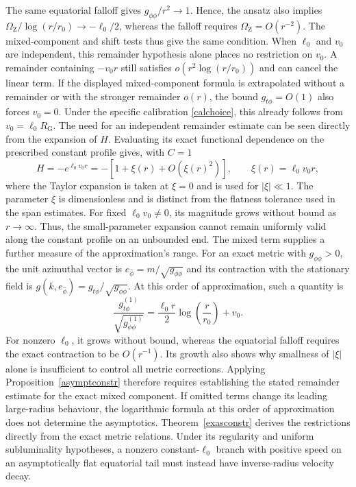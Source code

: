 \documentclass[amsmath,amsfonts,amssymb,aps,pra,superscriptaddress,10pt]{revtex4-2}
\numberwithin{equation}{section}
\theoremstyle{plain}
\theoremstyle{definition}
\theoremstyle{remark}
\theoremstyle{definition}
\newcommand{\ellzero}{\ell_0}
\newcommand{\RG}{R_{\mathrm G}}
\newcommand{\OmZ}{\Omega_{\mathrm Z}}
\begin{document}
The same equatorial falloff gives $g_{\phi\phi}/r^2\to 1$. Hence, the ansatz also implies $\OmZ/\log{(r/r_0)}\to-\ellzero/2$, whereas the falloff requires $\OmZ=O(r^{-2})$. The mixed-component and shift tests thus give the same condition. When $\ellzero$ and $v_0$ are independent, this remainder hypothesis alone places no restriction on $v_0$. A remainder containing $-v_0 r$ still satisfies $o(r^2\log{(r/r_0)})$ and can cancel the linear term. If the displayed mixed-component formula is extrapolated without a remainder or with the stronger remainder $o(r)$, the bound $g_{t\phi}=O(1)$ also forces $v_0=0$. Under the specific calibration \eqref{calchoice}, this already follows from $v_0=\ellzero\RG$. The need for an independent remainder estimate can be seen directly from the expansion of $H$. Evaluating its exact functional dependence on the prescribed constant profile gives, with $C=1$
\begin{equation}
H=-e^{\ellzero v_0r}=-\left[1+\xi(r)+O(\xi(r)^2)\right],\qquad \xi(r)=\ellzero v_0r,
\end{equation}
where the Taylor expansion is taken at $\xi=0$ and is used for $|\xi|\ll 1$. The parameter $\xi$ is dimensionless and is distinct from the flatness tolerance used in the span estimates. For fixed $\ellzero v_0\neq 0$, its magnitude grows without bound as $r\to\infty$. Thus, the small-parameter expansion cannot remain uniformly valid along the constant profile on an unbounded end. The mixed term supplies a further measure of the approximation's range. For an exact metric with $g_{\phi\phi}>0$, the unit azimuthal vector is $e_{\hat{\phi}}=m/\sqrt{g_{\phi\phi}}$ and its contraction with the stationary field is $g(k,e_{\hat{\phi}})=g_{t\phi}/\sqrt{g_{\phi\phi}}$. At this order of approximation, such a quantity is
\begin{equation}
\frac{g_{t\phi}^{(1)}}{\sqrt{g_{\phi\phi}^{(1)}}}
=\frac{\ellzero r}{2}\log{\left(\frac{r}{r_0}\right)}+v_0.
\end{equation}
For nonzero $\ellzero$, it grows without bound, whereas the equatorial falloff requires the exact contraction to be $O(r^{-1})$. Its growth also shows why smallness of $|\xi|$ alone is insufficient to control all metric corrections. Applying Proposition~\ref{asymptconstr} therefore requires establishing the stated remainder estimate for the exact mixed component. If omitted terms change its leading large-radius behaviour, the logarithmic formula at this order of approximation does not determine the asymptotics. Theorem~\ref{exasconstr} derives the restrictions directly from the exact metric relations. Under its regularity and uniform subluminality hypotheses, a nonzero constant-$\ellzero$ branch with positive speed on an asymptotically flat equatorial tail must instead have inverse-radius velocity decay.
\end{document}
